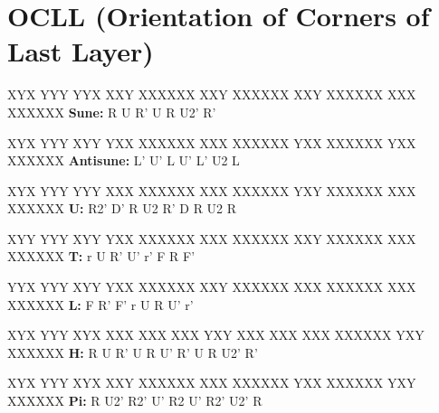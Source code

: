 \section{OCLL (Orientation of Corners of Last Layer)}

\begin{multicols}{2}

\RubikCubeGreyAll
\RubikFaceUp XYX YYY YYX
\RubikFaceFront XXY XXXXXX
\RubikFaceRight XXY XXXXXX
\RubikFaceBack XXY XXXXXX
\RubikFaceLeft XXX XXXXXX
	\noindent{}
\hspace{0.45cm}\textbf{Sune:} R U R' U R U2' R'
\vspace{0.2cm}

\RubikCubeGreyAll
\RubikFaceUp XYX YYY XYY
\RubikFaceFront YXX XXXXXX
\RubikFaceRight XXX XXXXXX
\RubikFaceBack YXX XXXXXX
\RubikFaceLeft YXX XXXXXX
	\noindent{}
\hspace{0.45cm}\textbf{Antisune:} L' U' L U' L' U2 L
\vspace{0.2cm}

\RubikCubeGreyAll
\RubikFaceUp XYX YYY YYY
\RubikFaceFront XXX XXXXXX
\RubikFaceRight XXX XXXXXX
\RubikFaceBack YXY XXXXXX
\RubikFaceLeft XXX XXXXXX
	\noindent{}
\hspace{0.45cm}\textbf{U:} R2' D' R U2 R' D R U2 R
\vspace{0.2cm}

\RubikCubeGreyAll
\RubikFaceUp XYY YYY XYY
\RubikFaceFront YXX XXXXXX
\RubikFaceRight XXX XXXXXX
\RubikFaceBack XXY XXXXXX
\RubikFaceLeft XXX XXXXXX
	\noindent{}
\hspace{0.45cm}\textbf{T:} r U R' U' r' F R F'
\vspace{0.2cm}

\RubikCubeGreyAll
\RubikFaceUp YYX YYY XYY
\RubikFaceFront YXX XXXXXX
\RubikFaceRight XXY XXXXXX
\RubikFaceBack XXX XXXXXX
\RubikFaceLeft XXX XXXXXX
	\noindent{}
\hspace{0.45cm}\textbf{L:} F R' F' r U R U' r'
\vspace{0.2cm}

\RubikCubeGreyAll
\RubikFaceUp XYX YYY XYX
\RubikFaceFront XXX XXX XXX
\RubikFaceRight YXY XXX XXX
\RubikFaceBack XXX XXXXXX
\RubikFaceLeft YXY XXXXXX
	\noindent{}
\hspace{0.45cm}\textbf{H:} R U R' U R U' R' U R U2' R'
\vspace{0.2cm}

\RubikCubeGreyAll
\RubikFaceUp XYX YYY XYX
\RubikFaceFront XXY XXXXXX
\RubikFaceRight XXX XXXXXX
\RubikFaceBack YXX XXXXXX
\RubikFaceLeft YXY XXXXXX
	\noindent{}
\hspace{0.2cm}\textbf{Pi:} R U2' R2' U' R2 U' R2' U2' R

\end{multicols}

